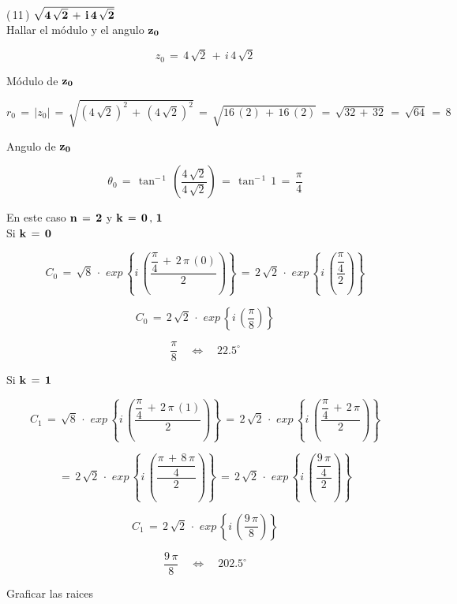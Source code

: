 \documentclass[a4paper,11pt,openany]{book}
\begin{document}
\textcolor{ao(english)}{(\,11\,)} $\bf{\sqrt{4\,\sqrt{2}\,+\,i\,4\,\sqrt{2}}}$\\

\textcolor{ao(english)}{} Hallar el módulo y el angulo $\bf{z_{0}}$

$$z_{0}\,=\,4\,\sqrt{2}\,+\,i\,4\,\sqrt{2}$$

\textcolor{ao(english)}{} Módulo de $\bf{z_{0}}$

$$r_{0}\,=\,|z_{0}|\,=\,\sqrt{\left(4\,\sqrt{2}\right)^{2}\,+\,\left(4\,\sqrt{2}\right)^{2}}\,=\,\sqrt{16\,(2)\,+\,16\,(2)}\,=\,\sqrt{32\,+\,32}\,=\,\sqrt{64}\,=\,8$$

\textcolor{ao(english)}{} Angulo de $\bf{z_{0}}$

$$\theta_{0}\,=\,\tan^{-\,1}\,\left(\dfrac{4\,\sqrt{2}}{4\,\sqrt{2}}\right)\,=\,\tan^{-\,1}\,1\,=\,\dfrac{\pi}{4}$$

\textcolor{ao(english)}{} En este caso $\bf{n\,=\,2}$ y $\bf{k\,=\,0\,,\,1}$\\

\textcolor{ao(english)}{} Si $\bf{k\,=\,0}$

$$C_{0}\,=\,\sqrt{8}\,\cdot\,\,exp\,\left\{i\,\left(\dfrac{\dfrac{\pi}{4}\,+\,2\,\pi\,(0)}{2}\right)\right\}\,=\,2\,\sqrt{2}\,\cdot\,\,exp\,\left\{i\,\left(\dfrac{\dfrac{\pi}{4}}{2}\right)\right\}$$

$$C_{0}\,=\,2\,\sqrt{2}\,\cdot\,\,exp\,\left\{i\,\left(\dfrac{\pi}{8}\right)\right\}$$

$$\dfrac{\pi}{8} \quad\iff\quad 22.5^\circ$$

\textcolor{ao(english)}{} Si $\bf{k\,=\,1}$

$$C_{1}\,=\,\sqrt{8}\,\cdot\,\,exp\,\left\{i\,\left(\dfrac{\dfrac{\pi}{4}\,+\,2\,\pi\,(1)}{2}\right)\right\}\,=\,2\,\sqrt{2}\,\cdot\,\,exp\,\left\{i\,\left(\dfrac{\dfrac{\pi}{4}\,+\,2\,\pi}{2}\right)\right\}$$

$$=\,2\,\sqrt{2}\,\cdot\,\,exp\,\left\{i\,\left(\dfrac{\dfrac{\pi\,+\,8\,\pi}{4}}{2}\right)\right\}\,=\,2\,\sqrt{2}\,\cdot\,\,exp\,\left\{i\,\left(\dfrac{\dfrac{9\,\pi}{4}}{2}\right)\right\}$$

$$C_{1}\,=\,2\,\sqrt{2}\,\cdot\,\,exp\,\left\{i\,\left(\dfrac{9\,\pi}{8}\right)\right\}$$

$$\dfrac{9\,\pi}{8} \quad\iff\quad 202.5^\circ$$

\textcolor{ao(english)}{} Graficar las raices
\end{document}
